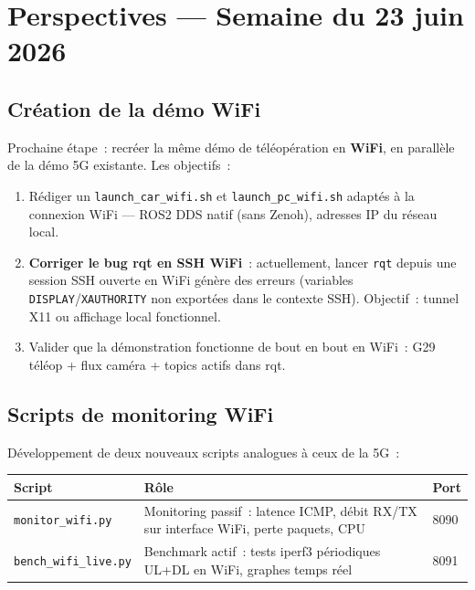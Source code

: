 \documentclass[a4paper,11pt]{article}
\begin{document}
\section{Perspectives — Semaine du 23 juin 2026}

\subsection{Création de la démo WiFi}

Prochaine étape~: recréer la même démo de téléopération en \textbf{WiFi}, en
parallèle de la démo 5G existante. Les objectifs~:

\begin{enumerate}[noitemsep, leftmargin=1.5cm]
  \item Rédiger un \texttt{launch\_car\_wifi.sh} et \texttt{launch\_pc\_wifi.sh}
        adaptés à la connexion WiFi — ROS2 DDS natif (sans Zenoh), adresses IP du réseau local.
  \item \textbf{Corriger le bug rqt en SSH WiFi}~: actuellement, lancer
        \texttt{rqt} depuis une session SSH ouverte en WiFi génère des erreurs
        (variables \texttt{DISPLAY}/\texttt{XAUTHORITY} non exportées dans le
        contexte SSH). Objectif~: tunnel X11 ou affichage local fonctionnel.
  \item Valider que la démonstration fonctionne de bout en bout en WiFi~:
        G29 téléop + flux caméra + topics actifs dans rqt.
\end{enumerate}

\subsection{Scripts de monitoring WiFi}

Développement de deux nouveaux scripts analogues à ceux de la 5G~:

\begin{center}
\begin{tabularx}{\textwidth}{@{}lXl@{}}
\toprule
\textbf{Script} & \textbf{Rôle} & \textbf{Port} \\
\midrule
\texttt{monitor\_wifi.py} & Monitoring passif~: latence ICMP, débit RX/TX sur interface WiFi, perte paquets, CPU & 8090 \\
\texttt{bench\_wifi\_live.py} & Benchmark actif~: tests iperf3 périodiques UL+DL en WiFi, graphes temps réel & 8091 \\
\bottomrule
\end{tabularx}
\end{center}
\end{document}
